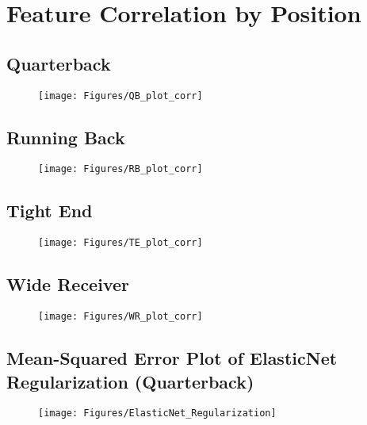 \section{Feature Correlation by Position}
\label{app:positionCorrPlots}

\subsection{Quarterback}
\begin{figure}[h]
	\centering
	\texttt{[image: Figures/QB\_plot\_corr]}
	\label{fig:qbplotcorr}
\end{figure}


\subsection{Running Back}
\begin{figure}[h]
	\centering
	\texttt{[image: Figures/RB\_plot\_corr]}
	\label{fig:rbplotcorr}
\end{figure}

\clearpage
\subsection{Tight End}
\begin{figure}[h]
	\centering
	\texttt{[image: Figures/TE\_plot\_corr]}
	\label{fig:teplotcorr}
\end{figure}

\subsection{Wide Receiver}
\begin{figure}[h]
	\centering
	\texttt{[image: Figures/WR\_plot\_corr]}
	\label{fig:wrplotcorr}
\end{figure}


\clearpage
\begin{landscape}
	\section{Mean-Squared Error Plot of ElasticNet Regularization (Quarterback)}
	\begin{figure}[h]
		\centering
		\texttt{[image: Figures/ElasticNet\_Regularization]}
		\label{fig:elasticnetregularization}
	\end{figure}
\end{landscape}




